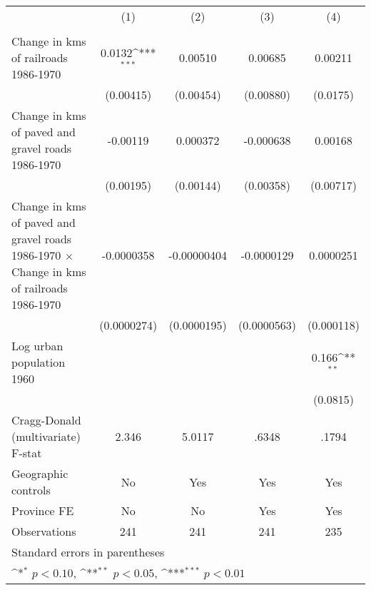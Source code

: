 {
\def\sym#1{\ifmmode^{#1}\else\(^{#1}\)\fi}
\begin{tabular}{l*{4}{c}}
\hline\hline
                &\multicolumn{1}{c}{(1)}&\multicolumn{1}{c}{(2)}&\multicolumn{1}{c}{(3)}&\multicolumn{1}{c}{(4)}\\
                &\multicolumn{1}{c}{}&\multicolumn{1}{c}{}&\multicolumn{1}{c}{}&\multicolumn{1}{c}{}\\
\hline
Change in kms of railroads 1986-1970&   0.0132\sym{***}&  0.00510         &  0.00685         &  0.00211         \\
                &(0.00415)         &(0.00454)         &(0.00880)         & (0.0175)         \\
[1em]
Change in kms of paved and gravel roads 1986-1970& -0.00119         & 0.000372         &-0.000638         &  0.00168         \\
                &(0.00195)         &(0.00144)         &(0.00358)         &(0.00717)         \\
[1em]
Change in kms of paved and gravel roads 1986-1970 $\times$ Change in kms of railroads 1986-1970&-0.0000358         &-0.00000404         &-0.0000129         &0.0000251         \\
                &(0.0000274)         &(0.0000195)         &(0.0000563)         &(0.000118)         \\
[1em]
Log urban population 1960&                  &                  &                  &    0.166\sym{**} \\
                &                  &                  &                  & (0.0815)         \\
\hline
Cragg-Donald (multivariate) F-stat&    2.346         &   5.0117         &    .6348         &    .1794         \\
Geographic controls&       No         &      Yes         &      Yes         &      Yes         \\
Province FE     &       No         &       No         &      Yes         &      Yes         \\
Observations    &      241         &      241         &      241         &      235         \\
\hline\hline
\multicolumn{5}{l}{\footnotesize Standard errors in parentheses}\\
\multicolumn{5}{l}{\footnotesize \sym{*} \(p<0.10\), \sym{**} \(p<0.05\), \sym{***} \(p<0.01\)}\\
\end{tabular}
}
